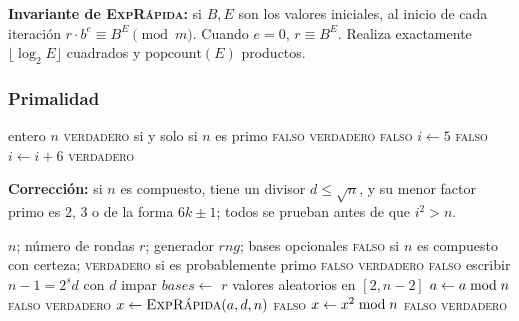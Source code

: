 \medskip
\noindent\textbf{Invariante de \textsc{ExpRápida}:} si $B, E$ son los valores
iniciales, al inicio de cada iteración $r \cdot b^{e} \equiv B^{E} \pmod m$.
Cuando $e = 0$, $r \equiv B^E$. Realiza exactamente
$\lfloor \log_2 E \rfloor$ cuadrados y $\mathrm{popcount}(E)$ productos.

\subsubsection{Primalidad}

\begin{algorithm}[H]
\caption{\textsc{PrimoPorDivisión}$(n)$ \hfill exacto}
\begin{algorithmic}[1]
\Require entero $n$
\Ensure \textsc{verdadero} si y solo si $n$ es primo
 \Return \textsc{falso} \EndIf
{} \Return \textsc{verdadero} \EndIf
{} \Return \textsc{falso} \EndIf
\State $i \gets 5$
 
   \Return \textsc{falso} \EndIf
  \State $i \gets i + 6$
\EndWhile
\State \Return \textsc{verdadero}
\end{algorithmic}
\end{algorithm}

\noindent\textbf{Corrección:} si $n$ es compuesto, tiene un divisor
$d \le \sqrt n$, y su menor factor primo es 2, 3 o de la forma $6k\pm1$; todos
se prueban antes de que $i^2 > n$.

\begin{algorithm}[H]
\caption{\textsc{MillerRabin}$(n, r, \mathit{rng}, \mathit{bases})$ \hfill probabilístico}
\label{alg:mr}
\begin{algorithmic}[1]
\Require $n$; número de rondas $r$; generador $\mathit{rng}$; bases opcionales
\Ensure \textsc{falso} si $n$ es compuesto con certeza; \textsc{verdadero} si es probablemente primo
 \Return \textsc{falso} \EndIf
{} \Return \textsc{verdadero} \EndIf
{} \Return \textsc{falso} \EndIf
\State escribir $n - 1 = 2^s d$ con $d$ impar
  \State $\mathit{bases} \gets$ $r$ valores aleatorios en $[2, n-2]$
\EndIf
{}
  \State $a \gets a \bmod n$
   \Continue \EndIf
   \Return \textsc{falso} \EndIf
\EndFor
\State \Return \textsc{verdadero}
\Statex
{}
  \State $x \gets \textsc{ExpRápida}(a, d, n)$
   \Return \textsc{falso} \EndIf
    \State $x \gets x^2 \bmod n$
     \Return \textsc{falso} \EndIf
  \EndFor
  \State \Return \textsc{verdadero} 
\EndFunction
\end{algorithmic}
\end{algorithm}

